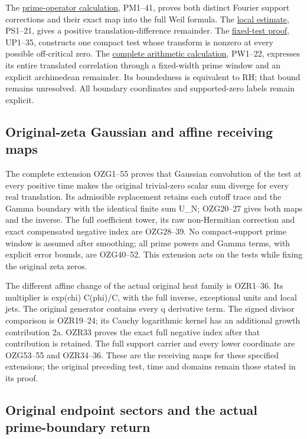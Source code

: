 \documentclass[
  10pt,
  a4paper,
]{article}
\begin{document}
The \href{PRIME_PROJECTOR_MOBIUS_DERIVATION.md}{prime-operator
calculation}, PM1--41, proves both distinct Fourier support corrections
and their exact map into the full Weil formula. The
\href{PRIMITIVE_SHORT_SUPPORT_DERIVATION.md}{local estimate}, PS1--21,
gives a positive translation-difference remainder. The
\href{UNIVERSAL_PRIMITIVE_TRANSLATION_CRITERION.md}{fixed-test proof},
UP1--35, constructs one compact test whose transform is nonzero at every
possible off-critical zero. The
\href{PRIMITIVE_PRIME_WINDOW_DERIVATION.md}{complete arithmetic
calculation}, PW1--22, expresses its entire translated correlation
through a fixed-width prime window and an explicit archimedean
remainder. Its boundedness is equivalent to RH; that bound remains
unresolved. All boundary coordinates and supported-zero labels remain
explicit.

\subsection{Original-zeta Gaussian and affine receiving
maps}\label{original-zeta-gaussian-and-affine-receiving-maps}

The complete extension OZG1--55 proves that Gaussian convolution of the
test at every positive time makes the original trivial-zero scalar sum
diverge for every real translation. Its admissible replacement retains
each cutoff trace and the Gamma boundary with the identical finite sum
U\_N; OZG20--27 gives both maps and the inverse. The full coefficient
tower, its raw non-Hermitian correction and exact compensated negative
index are OZG28--39. No compact-support prime window is assumed after
smoothing; all prime powers and Gamma terms, with explicit error bounds,
are OZG40--52. This extension acts on the tests while fixing the
original zeta zeros.

The different affine change of the actual original heat family is
OZR1--36. Its multiplier is exp(chi) C(phi)/C, with the full inverse,
exceptional units and local jets. The original generator contains every
q derivative term. The signed divisor comparison is OZR19--24; its
Cauchy logarithmic kernel has an additional growth contribution 2a.
OZR33 proves the exact full negative index after that contribution is
retained. The full support carrier and every lower coordinate are
OZG53--55 and OZR34--36. These are the receiving maps for these
specified extensions; the original preceding test, time and domains
remain those stated in its proof.

\subsection{Original endpoint sectors and the actual prime-boundary
return}\label{original-endpoint-sectors-and-the-actual-prime-boundary-return}
\end{document}

